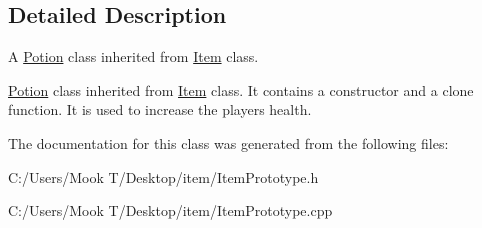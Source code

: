 \subsection{Detailed Description}
A \hyperlink{class_potion}{Potion} class inherited from \hyperlink{class_item}{Item} class. 

\hyperlink{class_potion}{Potion} class inherited from \hyperlink{class_item}{Item} class. It contains a constructor and a clone function. It is used to increase the player\textquotesingle{}s health. 

The documentation for this class was generated from the following files\+:\begin{DoxyCompactItemize}
\item 
C\+:/\+Users/\+Mook T/\+Desktop/item/Item\+Prototype.\+h\item 
C\+:/\+Users/\+Mook T/\+Desktop/item/Item\+Prototype.\+cpp\end{DoxyCompactItemize}
